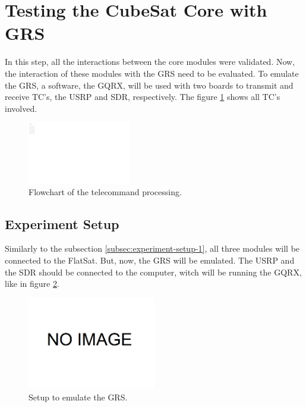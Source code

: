 \section{Testing the CubeSat Core with GRS}

In this step, all the interactions between the core modules were validated. Now, the interaction of these modules with the GRS need to be evaluated. To emulate the GRS, a software, the GQRX, will be used with two boards to transmit and receive TC's, the USRP and SDR, respectively. The figure \ref{fig:tc-flowchart} shows all TC's involved.

\begin{figure}[H]
	\begin{center}
		\includegraphics[width=0.4\textwidth]{figures/tc-flowchart.pdf}
		\caption{Flowchart of the telecommand processing.}
		\label{fig:tc-flowchart}
	\end{center}
\end{figure}

\subsection{Experiment Setup}

Similarly to the subsection \ref{subsec:experiment-setup-1}, all three modules will be connected to the FlatSat. But, now, the GRS will be emulated. The USRP and the SDR should be connected to the computer, witch will be running the GQRX, like in figure \ref{fig:connections-5}.

\begin{figure}[H]
	\begin{center}
		\includegraphics[width=0.5\textwidth]{figures/dummy-image.png}
		\caption{Setup to emulate the GRS.}
		\label{fig:connections-5}
	\end{center}
\end{figure}

